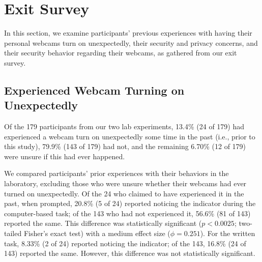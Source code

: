\documentclass{sigchi}
\begin{document}
\section{Exit Survey}


In this section, we examine participants' previous experiences with having their personal webcams turn on unexpectedly, their security and privacy concerns, and their security behavior regarding their webcams, as gathered from our exit survey.

\subsection{Experienced Webcam Turning on Unexpectedly}

Of the 179 participants from our two lab experiments, 13.4\% (24 of 179) had experienced a webcam turn on unexpectedly some time in the past (i.e., prior to this study), 79.9\% (143 of 179) had not, and the remaining 6.70\% (12 of 179) were unsure if this had ever happened. 



We compared participants' prior experiences with their behaviors in the laboratory, excluding those who were unsure whether their webcams had ever turned on unexpectedly. Of the 24 who claimed to have experienced it in the past, when prompted, 20.8\% (5 of 24) reported noticing the indicator during the computer-based task; of the 143 who had not experienced it, 56.6\% (81 of 143) reported the same. This difference was statistically significant ($p<0.0025$; two-tailed Fisher's exact test) with a medium effect size ($\phi=0.251$). For the written task, 8.33\% (2 of 24) reported noticing the indicator; of the 143, 16.8\% (24 of 143) reported the same. However, this difference was not statistically significant.
\end{document}
